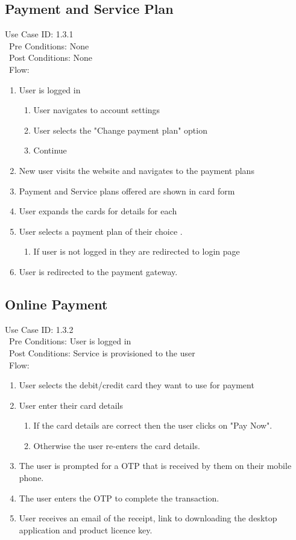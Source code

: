 \subsection{Payment and Service Plan} 
Use Case ID: 1.3.1\\\
Pre Conditions: None\\\
Post Conditions: None\\\
Flow: 
\begin{enumerate}
    \item User is logged in
    \begin{enumerate}
        \item User navigates to account settings
        \item User selects the "Change payment plan" option
        \item Continue
    \end{enumerate}
    \item New user visits the website and navigates to the payment plans
    \item Payment and Service plans offered are shown in card form
    \item User expands the cards for details for each
    \item User selects a payment plan of their choice .
    \begin{enumerate}
        \item If user is not logged in they are redirected to login page
    \end{enumerate}
    \item User is redirected to the payment gateway.
\end{enumerate}
\subsection{Online Payment} 
Use Case ID: 1.3.2\\\
Pre Conditions: User is logged in\\\
Post Conditions: Service is provisioned to the user\\\
Flow: 
\begin{enumerate}
    \item User selects the debit/credit card they want to use for payment
    \item User enter their card details
    \begin{enumerate}
        \item If the card details are correct then the user clicks on "Pay Now".
        \item Otherwise the user re-enters the card details.
    \end{enumerate}
    \item The user is prompted for a OTP that is received by them on their mobile phone.
    \item The user enters the OTP to complete the transaction.
    \item User receives an email of the receipt, link to downloading the desktop application and product licence key.
\end{enumerate}
